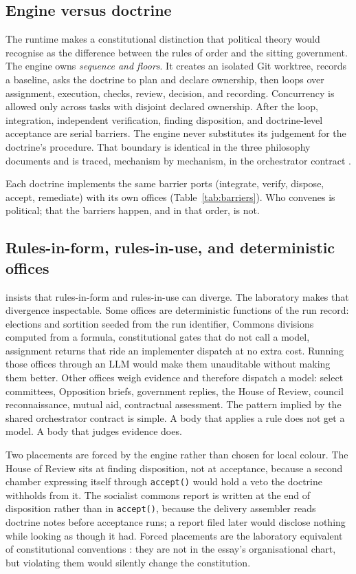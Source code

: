 \documentclass[11pt,a4paper]{article}
\begin{document}
\subsection{Engine versus doctrine}

The runtime makes a constitutional distinction that political theory would recognise as
the difference between the rules of order and the sitting government. The engine owns
\emph{sequence and floors}. It creates an isolated Git worktree, records a baseline,
asks the doctrine to plan and declare ownership, then loops over assignment, execution,
checks, review, decision, and recording. Concurrency is allowed only across tasks with
disjoint declared ownership. After the loop, integration, independent verification,
finding disposition, and doctrine-level acceptance are serial barriers. The engine never
substitutes its judgement for the doctrine's procedure. That boundary is identical in
the three philosophy documents and is traced, mechanism by mechanism, in the
orchestrator contract \citep{carr2026}.

Each doctrine implements the same barrier ports (integrate, verify, dispose,
accept, remediate) with its own offices (Table~\ref{tab:barriers}). Who convenes is
political; that the barriers happen, and in that order, is not.

\subsection{Rules-in-form, rules-in-use, and deterministic offices}

\citet{ostrom2005} insists that rules-in-form and rules-in-use can diverge. The
laboratory makes that divergence inspectable. Some offices are deterministic functions
of the run record: elections and sortition seeded from the run identifier, Commons
divisions computed from a formula, constitutional gates that do not call a model,
assignment returns that ride an implementer dispatch at no extra cost. Running those
offices through an LLM would make them unauditable without making them better. Other
offices weigh evidence and therefore dispatch a model: select committees, Opposition
briefs, government replies, the House of Review, council reconnaissance, mutual aid,
contractual assessment. The pattern implied by the shared orchestrator contract is
simple. A body that applies a rule does not get a model. A body that judges evidence
does.

Two placements are forced by the engine rather than chosen for local colour. The House
of Review sits at finding disposition, not at acceptance, because a second chamber
expressing itself through \texttt{accept()} would hold a veto the doctrine withholds
from it. The socialist commons report is written at the end of disposition rather than
in \texttt{accept()}, because the delivery assembler reads doctrine notes before
acceptance runs; a report filed later would disclose nothing while looking as though it
had. Forced placements are the laboratory equivalent of constitutional conventions
\citep{dicey1885}: they are not in the essay's organisational chart, but violating them
would silently change the constitution.
\end{document}
